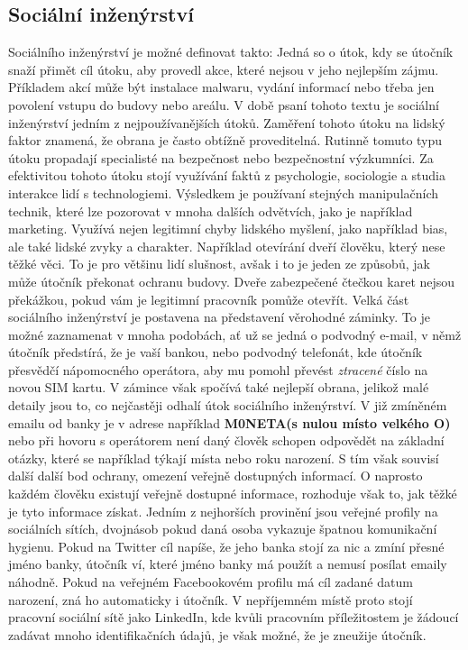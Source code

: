 \subsection{Sociální inženýrství}\label{subsec:socialni-inzenyrstvi}
Sociálního inženýrství je možné definovat takto:
Jedná so o útok, kdy se útočník snaží přimět cíl útoku, aby provedl akce, které nejsou v jeho nejlepším zájmu\cite{moje_bakalarka}.
Příkladem akcí může být instalace malwaru, vydání informací nebo třeba jen povolení vstupu do budovy nebo areálu.
V době psaní tohoto textu je sociální inženýrství jedním z nejpoužívanějších útoků.
Zaměření tohoto útoku na lidský faktor znamená, že obrana je často obtížně proveditelná.
Rutinně tomuto typu útoku propadají specialisté na bezpečnost nebo bezpečnostní výzkumníci.
Za efektivitou tohoto útoku stojí využívání faktů z psychologie, sociologie a studia interakce lidí s technologiemi.
Výsledkem je používaní stejných manipulačních technik, které lze pozorovat v mnoha dalších odvětvích, jako je například marketing.
Využívá nejen legitimní chyby lidského myšlení, jako například bias, ale také lidské zvyky a charakter.
Například otevírání dveří člověku, který nese těžké věci.
To je pro většinu lidí slušnost, avšak i to je jeden ze způsobů, jak může útočník překonat ochranu budovy.
Dveře zabezpečené čtečkou karet nejsou překážkou, pokud vám je legitimní pracovník pomůže otevřít.
Velká část sociálního inženýrství je postavena na představení věrohodné záminky.
To je možné zaznamenat v mnoha podobách, ať už se jedná o podvodný e-mail, v němž útočník předstírá, že je vaší bankou, nebo podvodný telefonát, kde útočník přesvědčí nápomocného operátora, aby mu pomohl převést \textit{ztracené} číslo na novou \ac{SIM} kartu.
V zámince však spočívá také nejlepší obrana, jelikož malé detaily jsou to, co nejčastěji odhalí útok sociálního inženýrství.
V již zmíněném emailu od banky je v adrese například \textbf{M0NETA(s nulou místo velkého O)} nebo při hovoru s operátorem není daný člověk schopen odpovědět na základní otázky, které se například týkají místa nebo roku narození.
S tím však souvisí další další bod ochrany, omezení veřejně dostupných informací.
O naprosto každém člověku existují veřejně dostupné informace, rozhoduje však to, jak těžké je tyto informace získat.
Jedním z nejhorších provinění jsou veřejné profily na sociálních sítích, dvojnásob pokud daná osoba vykazuje špatnou komunikační hygienu.
Pokud na Twitter cíl napíše, že jeho banka stojí za nic a zmíní přesné jméno banky, útočník ví, které jméno banky má použít a nemusí posílat emaily náhodně.
Pokud na veřejném Facebookovém profilu má cíl zadané datum narození, zná ho automaticky i útočník.
V nepříjemném místě proto stojí pracovní sociální sítě jako LinkedIn, kde kvůli pracovním příležitostem je žádoucí zadávat mnoho identifikačních údajů, je však možné, že je zneužije útočník.\cite{moje_bakalarka}


